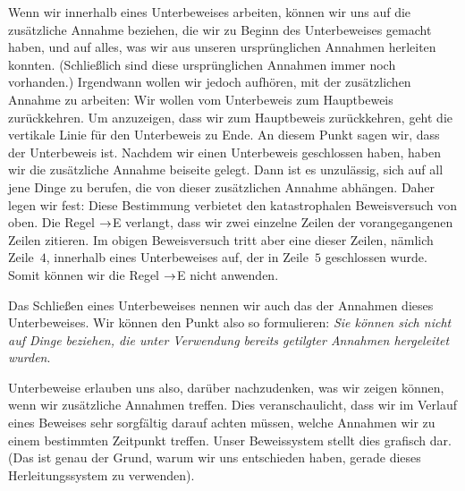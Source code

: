 Wenn wir innerhalb eines Unterbeweises arbeiten, können wir uns auf die zusätzliche Annahme beziehen, die wir zu Beginn des Unterbeweises gemacht haben, und auf alles, was wir aus unseren ursprünglichen Annahmen herleiten konnten. (Schlie{\ss}lich sind diese ursprünglichen Annahmen immer noch vorhanden.) Irgendwann wollen wir jedoch aufhören, mit der zusätzlichen Annahme zu arbeiten: Wir wollen vom Unterbeweis zum Hauptbeweis zurückkehren. Um anzuzeigen, dass wir zum Hauptbeweis zurückkehren, geht die vertikale Linie für den Unterbeweis zu Ende. An diesem Punkt sagen wir, dass der Unterbeweis  ist. Nachdem wir einen Unterbeweis geschlossen haben, haben wir die zusätzliche Annahme beiseite gelegt. Dann ist es unzulässig, sich auf all jene Dinge zu berufen, die von dieser zusätzlichen Annahme abhängen. Daher legen wir fest:
Diese Bestimmung verbietet den katastrophalen Beweisversuch von oben. Die Regel $\rightarrow$E verlangt, dass wir zwei einzelne Zeilen der vorangegangenen Zeilen zitieren. Im obigen Beweisversuch tritt aber eine dieser Zeilen, nämlich Zeile~$4$, innerhalb eines Unterbeweises auf, der in Zeile~$5$ geschlossen wurde. Somit können wir die Regel $\rightarrow$E nicht anwenden. 

Das Schlie{\ss}en eines Unterbeweises nennen wir auch das  der Annahmen dieses Unterbeweises. Wir können den Punkt also so formulieren: \emph{Sie können sich nicht auf Dinge beziehen, die unter Verwendung bereits getilgter Annahmen hergeleitet wurden}. 

Unterbeweise erlauben uns also, darüber nachzudenken, was wir zeigen können, wenn wir zusätzliche Annahmen treffen. Dies veranschaulicht, dass wir im Verlauf eines Beweises sehr sorgfältig darauf achten müssen, welche Annahmen wir zu einem bestimmten Zeitpunkt treffen. Unser Beweissystem stellt dies grafisch dar. (Das ist genau der Grund, warum wir uns entschieden haben, gerade dieses Herleitungssystem zu verwenden).

